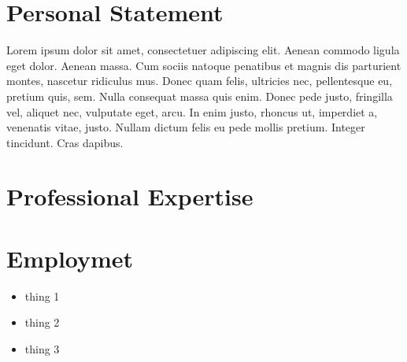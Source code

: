 \documentclass[11pt,a4paper]{my_cv}
\begin{document}
\begin{cvheader}
\end{cvheader}

\section{Personal Statement}
Lorem ipsum dolor sit amet, consectetuer adipiscing elit. 
Aenean commodo ligula eget dolor.
Aenean massa.
Cum sociis natoque penatibus et magnis dis parturient montes, nascetur ridiculus mus.
Donec quam felis, ultricies nec, pellentesque eu, pretium quis, sem.
Nulla consequat massa quis enim.
Donec pede justo, fringilla vel, aliquet nec, vulputate eget, arcu.
In enim justo, rhoncus ut, imperdiet a, venenatis vitae, justo.
Nullam dictum felis eu pede mollis pretium.
Integer tincidunt.
Cras dapibus.

\section{Professional Expertise}
\begin{expertise}
\end{expertise}

\section{Employmet}
\begin{itemize}
    \item{thing 1}
    \item{thing 2}
    \item{thing 3}
\end{itemize}

\end{document}
